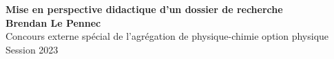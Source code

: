 \documentclass[11pt]{extarticle}
\begin{document}
\begin{center}
    \textbf {\Large Mise en perspective didactique d’un dossier de recherche} \\
    \vspace{0.2cm}
    \textbf{Brendan Le Pennec} \\
    \vspace{0.2cm}
    Concours externe spécial de l’agrégation de physique-chimie option physique \\
    Session 2023
  \end{center}

  
  
  
  \vspace{2mm}
  
  
  \vspace{2mm}
  
  
  
\end{document}
